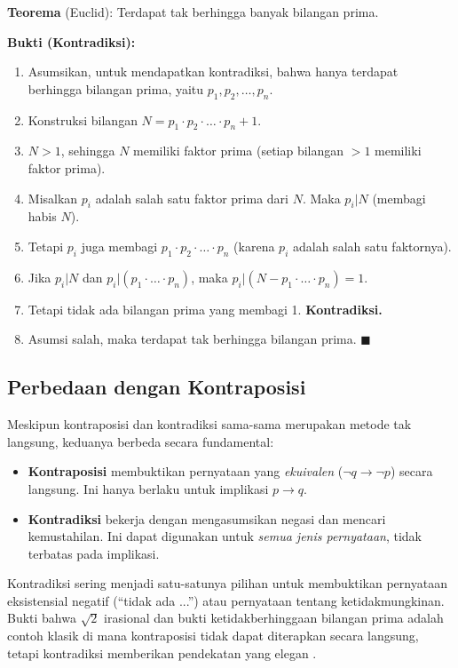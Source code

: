 \begin{contoh}
\textbf{Teorema} (Euclid): Terdapat tak berhingga banyak bilangan prima.

\textbf{Bukti (Kontradiksi):}
\begin{enumerate}
    \item Asumsikan, untuk mendapatkan kontradiksi, bahwa hanya terdapat berhingga bilangan prima, yaitu $p_1, p_2, \ldots, p_n$.
    \item Konstruksi bilangan $N = p_1 \cdot p_2 \cdot \ldots \cdot p_n + 1$.
    \item $N > 1$, sehingga $N$ memiliki faktor prima (setiap bilangan $> 1$ memiliki faktor prima).
    \item Misalkan $p_i$ adalah salah satu faktor prima dari $N$. Maka $p_i | N$ (membagi habis $N$).
    \item Tetapi $p_i$ juga membagi $p_1 \cdot p_2 \cdot \ldots \cdot p_n$ (karena $p_i$ adalah salah satu faktornya).
    \item Jika $p_i | N$ dan $p_i | (p_1 \cdot \ldots \cdot p_n)$, maka $p_i | (N - p_1 \cdot \ldots \cdot p_n) = 1$.
    \item Tetapi tidak ada bilangan prima yang membagi 1. \textbf{Kontradiksi.}
    \item Asumsi salah, maka terdapat tak berhingga bilangan prima. $\blacksquare$
\end{enumerate}
\end{contoh}

\subsection{Perbedaan dengan Kontraposisi}

Meskipun kontraposisi dan kontradiksi sama-sama merupakan metode tak langsung, keduanya berbeda secara fundamental:

\begin{itemize}
    \item \textbf{Kontraposisi} membuktikan pernyataan yang \emph{ekuivalen} ($\neg q \rightarrow \neg p$) secara langsung. Ini hanya berlaku untuk implikasi $p \rightarrow q$.
    \item \textbf{Kontradiksi} bekerja dengan mengasumsikan negasi dan mencari kemustahilan. Ini dapat digunakan untuk \emph{semua jenis pernyataan}, tidak terbatas pada implikasi.
\end{itemize}

\begin{konsep}
Kontradiksi sering menjadi satu-satunya pilihan untuk membuktikan pernyataan eksistensial negatif (``tidak ada ...'') atau pernyataan tentang ketidakmungkinan. Bukti bahwa $\sqrt{2}$ irasional dan bukti ketidakberhinggaan bilangan prima adalah contoh klasik di mana kontraposisi tidak dapat diterapkan secara langsung, tetapi kontradiksi memberikan pendekatan yang elegan \cite{wiki_mathematical_proof}.
\end{konsep}
